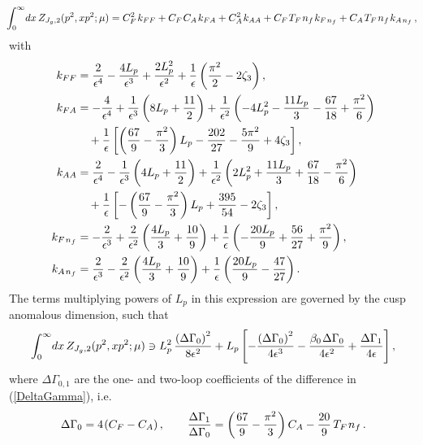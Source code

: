 \documentclass[12pt]{article}
\newcommand{\spac}{{\hspace{0.3mm}}}
\numberwithin{equation}{section}
\begin{document}
\begin{equation}
   \!\!\int_0^\infty\!dx\,Z_{J_g,2}(p^2,x p^2;\mu) 
   = C_F^2\spac k_{FF} + C_F\spac C_A\spac k_{FA} + C_A^2\spac k_{AA} 
    + C_F\spac T_F\spac n_f\spac k_{F\spac n_f}+ C_A\spac T_F\spac n_f\spac k_{A\spac n_f} \,,
\end{equation}
with
\begin{align}
   k_{FF} &= \frac{2}{\epsilon ^4} - \frac{4 L_p}{\epsilon^3} + \frac{2 L_p^2}{\epsilon^2}
    + \frac{1}{\epsilon} \left( \frac{\pi^2}{2} - 2\zeta_3 \right) , \notag\\
   k_{FA} &= - \frac{4}{\epsilon^4} + \frac{1}{\epsilon^3} \left( 8 L_p + \frac{11}{2} \right)
    + \frac{1}{\epsilon^2} \left( - 4 L_p^2 - \frac{11 L_p}{3} - \frac{67}{18} + \frac{\pi^2}{6} \right) \notag\\
   &\quad + \frac{1}{\epsilon} \left[ \left(\frac{67}{9} - \frac{\pi^2}{3} \right) L_p
    - \frac{202}{27} - \frac{5\pi^2}{9} + 4\zeta_3 \right] , \notag\\
   k_{AA} &= \frac{2}{\epsilon^4} - \frac{1}{\epsilon^3} \left( 4 L_p + \frac{11}{2} \right)
    + \frac{1}{\epsilon^2} \left( 2 L_p^2 + \frac{11 L_p}{3} + \frac{67}{18} - \frac{\pi^2}{6} \right) \\
   &\quad + \frac{1}{\epsilon} \left[ - \left( \frac{67}{9} - \frac{\pi^2}{3} \right) L_p 
    + \frac{395}{54} - 2\zeta_3 \right] , \notag\\
   k_{F\spac n_f} &= - \frac{2}{\epsilon^3} + \frac{2}{\epsilon^2} \left( \frac{4 L_p}{3} + \frac{10}{9} \right)
    + \frac{1}{\epsilon} \left( - \frac{20 L_p}{9} + \frac{56}{27} + \frac{\pi^2}{9} \right) , \notag\\
   k_{A\spac n_f} &= \frac{2}{\epsilon^3} - \frac{2}{\epsilon^2} \left( \frac{4 L_p}{3} + \frac{10}{9} \right)
    + \frac{1}{\epsilon} \left( \frac{20 L_p}{9} - \frac{47}{27} \right) . \notag
\end{align}
The terms multiplying powers of $L_p$ in this expression are governed by the cusp anomalous dimension, such that
\begin{equation}
   \int_0^\infty\!dx\,Z_{J_g,2}(p^2,x p^2;\mu)
   \ni L_p^2\,\frac{\left( \Delta\Gamma_0\right)^2}{8\epsilon^2}
    + L_p \left[  - \frac{\left( \Delta\Gamma_0 \right)^2}{4\epsilon^3}
    - \frac{\beta_0\spac\Delta\Gamma_0}{4\epsilon^2} + \frac{\Delta\Gamma_1}{4\epsilon} \right] ,
\end{equation}
where $\Delta\Gamma_{0,1}$ are the one- and two-loop coefficients of the difference in (\ref{DeltaGamma}), i.e.\ 
\cite{Korchemsky:1987wg,Korchemskaya:1992je}
\begin{equation}
   \Delta\Gamma_0 = 4\spac(C_F-C_A) \,, \qquad
   \frac{\Delta\Gamma_1}{\Delta\Gamma_0} 
   = \left( \frac{67}{9} - \frac{\pi^2}{3} \right) C_A - \frac{20}{9}\,T_F\spac n_f \,.
\end{equation}
\end{document}
